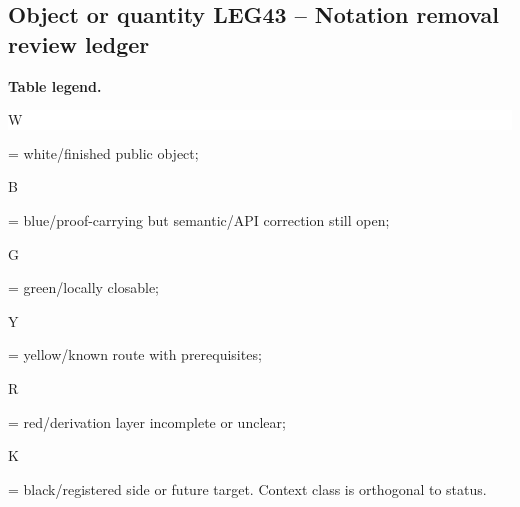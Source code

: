 \subsection*{Object or quantity LEG43 -- Notation removal review ledger}
\hypertarget{objproof:LEG43}{}
\par\smallskip\noindent\begin{minipage}{0.99\linewidth}\footnotesize\raggedright\textbf{Table legend.} \colorbox{white}{\strut W} = white/finished public object; \colorbox{cyan!20}{\strut B} = blue/proof-carrying but semantic/API correction still open; \colorbox{green!18}{\strut G} = green/locally closable; \colorbox{yellow!25}{\strut Y} = yellow/known route with prerequisites; \colorbox{red!20}{\strut R} = red/derivation layer incomplete or unclear; \colorbox{black!18}{\strut K} = black/registered side or future target. Context class is orthogonal to status.\end{minipage}\par\vspace{0.25em}
